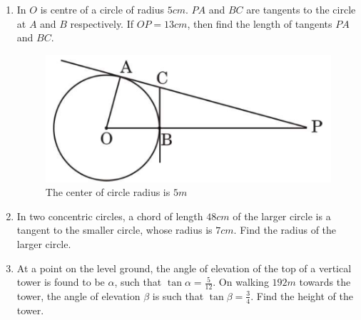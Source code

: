 \begin{enumerate}[label=\thesection.\arabic*.,ref=\theenumi]
    \item In $O$ is centre of a circle of radius $5 cm$. $PA$ and $BC$ are tangents to the circle at $A$ and $B$ respectively. If $OP = 13 cm$, then find the length of tangents $PA$ and $BC$.
\begin{figure}[H]                                                                                             
\centering                                                                                                
\includegraphics[width = \columnwidth]{figs/circle_radius23.png}
\caption{The center of circle radius is $5m$}
	\label{fig:circle_radius23}        
\end{figure}

    \item In two concentric circles, a chord of length $48 cm$ of the larger
circle is a tangent to the smaller circle, whose radius is $7 cm$. Find the radius of the larger circle. 
    \item At a point on the level ground, the angle of elevation of the top
of a vertical tower is found to be $\alpha$, such that $\tan \alpha =\frac{5}{12} $. On walking $192 m$ towards the tower, the angle of elevation $\beta$ is such that $\tan \beta=\frac{3}{4}$. Find the height of the tower. 
\end{enumerate}
